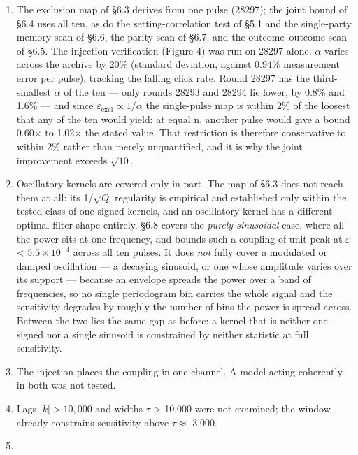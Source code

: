 \documentclass[
  11pt,
]{article}
\providecommand{\tightlist}{%
  \setlength{\itemsep}{0pt}\setlength{\parskip}{0pt}}
\begin{document}
\begin{enumerate}
\def\labelenumi{\arabic{enumi}.}
\tightlist
\item
  The exclusion map of \S6.3 derives from one pulse (28297); the joint
  bound of \S6.4 uses all ten, as do the setting-correlation test of
  \S5.1 and the single-party memory scan of \S6.6, the parity scan of
  \S6.7, and the outcome--outcome scan of \S6.5. The injection
  verification (Figure 4) was run on 28297 alone. \(\alpha\) varies
  across the archive by 20\% (standard deviation, against 0.94\%
  measurement error per pulse), tracking the falling click rate. Round
  28297 has the third-smallest \(\alpha\) of the ten --- only rounds
  28293 and 28294 lie lower, by 0.8\% and 1.6\% --- and since
  \(\varepsilon_{\mathrm{excl}} \propto 1/\alpha\) the single-pulse map
  is within 2\% of the loosest that any of the ten would yield: at equal
  n, another pulse would give a bound 0.60\(\times\) to 1.02\(\times\)
  the stated value. That restriction is therefore conservative to within
  2\% rather than merely unquantified, and it is why the joint
  improvement exceeds \(\sqrt{10}\).
\item
  Oscillatory kernels are covered only in part. The map of \S6.3 does
  not reach them at all: its 1/\(\sqrt{Q}\) regularity is empirical and
  established only within the tested class of one-signed kernels, and an
  oscillatory kernel has a different optimal filter shape entirely.
  \S6.8 covers the \emph{purely sinusoidal} case, where all the power
  sits at one frequency, and bounds such a coupling of unit peak at
  \(\varepsilon\) \textless{} \(5.5 \times 10^{-4}\) across all ten
  pulses. It does \emph{not} fully cover a modulated or damped
  oscillation --- a decaying sinusoid, or one whose amplitude varies
  over its support --- because an envelope spreads the power over a band
  of frequencies, so no single periodogram bin carries the whole signal
  and the sensitivity degrades by roughly the number of bins the power
  is spread across. Between the two lies the same gap as before: a
  kernel that is neither one-signed nor a single sinusoid is constrained
  by neither statistic at full sensitivity.
\item
  The injection places the coupling in one channel. A model acting
  coherently in both was not tested.
\item
  Lags \(|k| > 10{,}000\) and widths \(\tau\) \textgreater{} 10,000 were
  not examined; the window already constrains sensitivity above
  \(\tau \approx\) 3,000.
\item

\end{enumerate}
\end{document}
